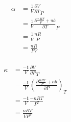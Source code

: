 \documentclass[10pt]{article} %
\begin{document}
\begin{align}
  \alpha &= \frac{1}{V}\frac{\partial V}{\partial T}_P\\
  &= \frac{1}{V}\frac{\partial \frac{nRT}{P}+nb}{\partial T}_P\\
  &= \frac{1}{V} \frac{nR}{P}\\
  &= \frac{nR}{PV}\\
\end{align}

\begin{align}
  \kappa &= \frac{-1}{V}\frac{\partial V}{\partial P}_T\\
  &= \frac{-1}{V}(\frac{\partial \frac{nRT}{P}+nb}{\partial P})_T\\
  &= \frac{-1}{V}\frac{-nRT}{P^2}\\
  &= \frac{nRT}{VP^2}\\
\end{align}
\end{document}
